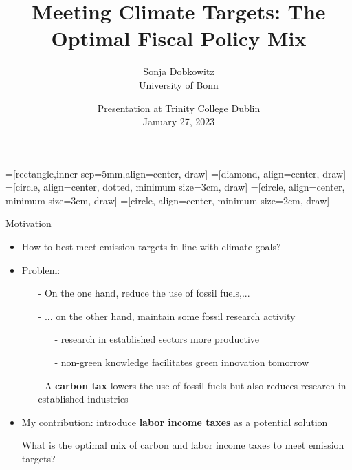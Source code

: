 \documentclass[11pt,aspectratio=169]{beamer}
\author[Sonja Dobkowitz]{\small Sonja Dobkowitz\\ \footnotesize{University of Bonn%
}\\ }
\title{Meeting Climate Targets: The Optimal Fiscal Policy Mix}
\date{\small{Presentation at Trinity College Dublin\\ January 27, 2023 }}
\begin{document}
=[rectangle,inner sep=5mm,align=center, draw]
=[diamond, align=center, draw]
=[circle, align=center, dotted, minimum size=3cm, draw]
=[circle, align=center, minimum size=3cm, draw]
=[circle, align=center, minimum size=2cm, draw]
{
	\begin{frame}
		\titlepage
	\end{frame}
}



\addtocounter{framenumber}{-1}
\begin{frame}{Motivation}
	\begin{itemize}[<+-| alert@+>]
		\item How to best meet emission targets in line with climate goals? %
		\vspace{3mm}
		\item Problem:
		\begin{itemize}
			\item[-] On the one hand,  reduce the use of fossil fuels,...
			\vspace{2mm}
			\item[-] ... on the other hand, %
			maintain some fossil research activity 
			\vspace{1mm}
			\begin{enumerate}
				\item[-] research in established sectors more productive
				\item[-] non-green knowledge facilitates green innovation tomorrow %
			\end{enumerate}%
			\vspace{2mm}				
			\item[-] A \textbf{carbon tax} lowers the use of fossil fuels but also reduces research in established industries %
		\end{itemize} 
		\vspace{3mm}
		\item My contribution: introduce \textbf{labor income taxes} as a potential solution
		\vspace{3mm}
		\item[] \hspace{-4mm}\alert{{What is the optimal mix of carbon and labor income taxes to meet emission targets?}}
	\end{itemize}
\end{frame}
\end{document}
